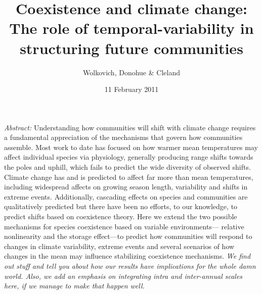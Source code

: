 \documentclass[11pt,a4paper,oneside]{article}
\begin{document}
\renewcommand{\labelitemi}{$ $}
\title{Coexistence and climate change: \\The role of
    temporal-variability in structuring future communities}
    \author{Wolkovich, Donohue \& Cleland}
\date{11 February 2011}
\maketitle
\noindent \emph{Abstract:} Understanding how communities will shift
with climate change requires a fundamental appreciation of the
mechanisms that govern how communities assemble. Most work to date has
focused on how warmer mean temperatures may affect individual species
via physiology, generally producing range shifts towards the poles and
uphill, which fails to predict the wide diversity of observed shifts.
Climate change has and is predicted to affect far more than mean
temperatures, including widespread affects on growing season
length, variability and shifts in extreme events. Additionally,
cascading effects on species and communities are qualitatively
predicted but there have been no efforts, to our knowledge, to predict
shifts based on coexistence theory. Here we extend the two possible
mechanisms for species coexistence based on variable environments---
relative nonlinearity and the storage effect---to predict how
communities will respond to changes in climate variability, extreme
events and several scenarios of how changes in the mean may influence
stabilizing coexistence mechanisms. \emph{We find out stuff and tell you
about how our results have implications for the whole damn
world. Also, we add an emphasis on integrating intra and inter-annual
scales here, if we manage to make that happen well.}
\end{document}
